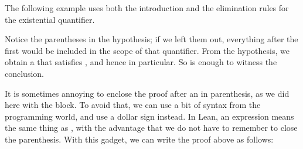 \documentclass[letterpaper,10pt,english]{sphinxmanual}
\begin{document}
\sphinxAtStartPar
The following example uses both the introduction and the elimination rules for the existential quantifier.

\begin{sphinxVerbatim}[commandchars=\\\{\}]
   
      

              
          
 
           
         
          
\end{sphinxVerbatim}

\sphinxAtStartPar
Notice the parentheses in the hypothesis; if we left them out, everything after the first  would be included in the scope of that quantifier. From the hypothesis, we obtain a  that satisfies , and hence  in particular. So  is enough to witness the conclusion.

\sphinxAtStartPar
It is sometimes annoying to enclose the proof after an  in parenthesis, as we did here with the  block. To avoid that, we can use a bit of syntax from the programming world, and use a dollar sign instead. In Lean, an expression  means the same thing as , with the advantage that we do not have to remember to close the parenthesis. With this gadget, we can write the proof above as follows:
\end{document}
